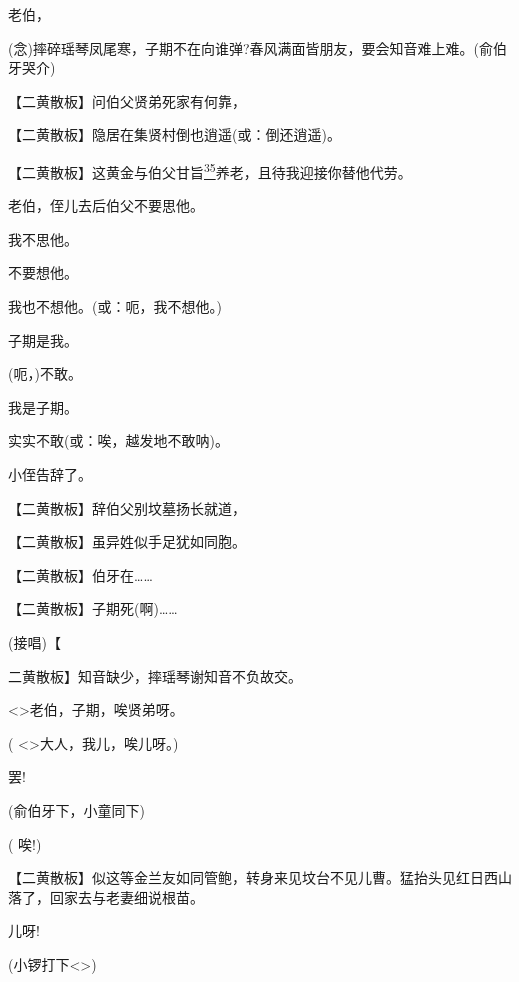 { 老伯，

 ({\akai 念})摔碎瑶琴凤尾寒，子期不在向谁弹?春风满面皆朋友，要会知音难上难。(俞伯牙哭介)

 【二黄散板】问伯父贤弟死家有何靠，

 【二黄散板】隐居在集贤村倒也逍遥(或：倒还逍遥)。

 【二黄散板】这黄金与伯父甘旨\protect\hyperlink{fn35}{\textsuperscript{35}}养老，且待我迎接你替他代劳。

 老伯，侄儿去后伯父不要思他。

 我不思他。

 不要想他。

 我也不想他。(或：呃，我不想他。)

 子期是我。

 (呃，)不敢。

 我是子期。

 实实不敢(或：唉，越发地不敢呐)。

 小侄告辞了。

 【二黄散板】辞伯父别坟墓扬长就道，

 【二黄散板】虽异姓似手足犹如同胞。

 【二黄散板】伯牙在\ldots{}\ldots{}

 【二黄散板】子期死(啊)\ldots{}\ldots{}

 (接唱)【{\akai 二黄散板】知音缺少，摔瑶琴谢知音不负故交。

 \textless{}\!\textgreater{}老伯，子期，唉贤弟呀。

( \textless{}\!\textgreater{}大人，我儿，唉儿呀。)

 罢!

(俞伯牙下，小童同下)

( 唉!)

 【二黄散板】似这等金兰友如同管鲍，转身来见坟台不见儿曹。猛抬头见红日西山落了，回家去与老妻细说根苗。

 儿呀!

(小锣打下\textless{}\!\textgreater{})
}

}

